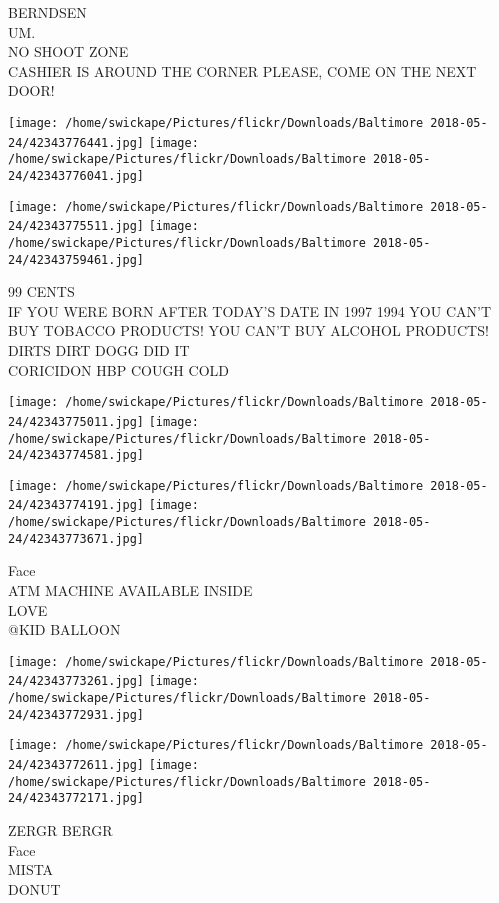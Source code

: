 \documentclass[10pt,letterpaper]{article}
\begin{document}
BERNDSEN\\
UM.\\
NO SHOOT ZONE\\
CASHIER IS AROUND THE CORNER PLEASE, COME ON THE NEXT DOOR!\\
\pagebreak

\texttt{[image: /home/swickape/Pictures/flickr/Downloads/Baltimore 2018-05-24/42343776441.jpg]}
\texttt{[image: /home/swickape/Pictures/flickr/Downloads/Baltimore 2018-05-24/42343776041.jpg]}

\texttt{[image: /home/swickape/Pictures/flickr/Downloads/Baltimore 2018-05-24/42343775511.jpg]}
\texttt{[image: /home/swickape/Pictures/flickr/Downloads/Baltimore 2018-05-24/42343759461.jpg]}

99 CENTS\\
IF YOU WERE BORN AFTER TODAY'S DATE IN 1997 1994 YOU CAN'T BUY TOBACCO PRODUCTS!  YOU CAN'T BUY ALCOHOL PRODUCTS!\\
DIRTS DIRT DOGG DID IT\\
CORICIDON HBP COUGH COLD\\
\pagebreak

\texttt{[image: /home/swickape/Pictures/flickr/Downloads/Baltimore 2018-05-24/42343775011.jpg]}
\texttt{[image: /home/swickape/Pictures/flickr/Downloads/Baltimore 2018-05-24/42343774581.jpg]}

\texttt{[image: /home/swickape/Pictures/flickr/Downloads/Baltimore 2018-05-24/42343774191.jpg]}
\texttt{[image: /home/swickape/Pictures/flickr/Downloads/Baltimore 2018-05-24/42343773671.jpg]}

Face\\
ATM MACHINE AVAILABLE INSIDE\\
LOVE\\
@KID BALLOON\\
\pagebreak

\texttt{[image: /home/swickape/Pictures/flickr/Downloads/Baltimore 2018-05-24/42343773261.jpg]}
\texttt{[image: /home/swickape/Pictures/flickr/Downloads/Baltimore 2018-05-24/42343772931.jpg]}

\texttt{[image: /home/swickape/Pictures/flickr/Downloads/Baltimore 2018-05-24/42343772611.jpg]}
\texttt{[image: /home/swickape/Pictures/flickr/Downloads/Baltimore 2018-05-24/42343772171.jpg]}

ZERGR BERGR\\
Face\\
MISTA\\
DONUT\\
\pagebreak
\end{document}
